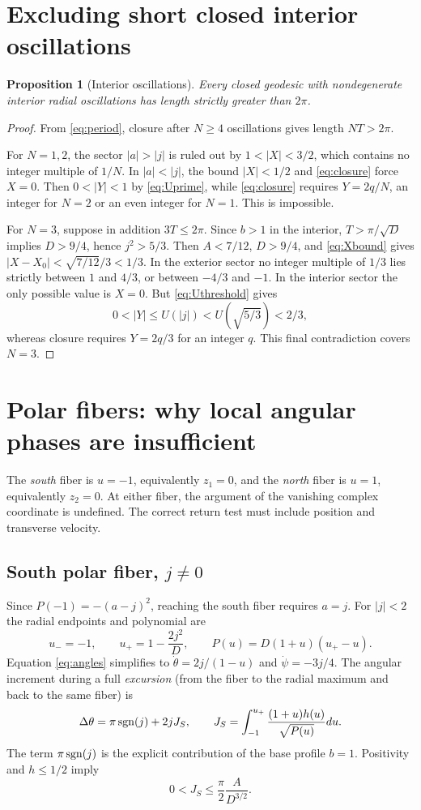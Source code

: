 \documentclass[11pt,a4paper]{article}
\newtheorem{proposition}[theorem]{Proposition}
\theoremstyle{remark}\newtheorem{remark}[theorem]{Remark}
\begin{document}
\section{Excluding short closed interior oscillations}
\begin{proposition}[Interior oscillations]\label{prop:interior}
Every closed geodesic with nondegenerate interior radial oscillations has length strictly greater than $2\pi$.
\end{proposition}
\begin{proof}
From \eqref{eq:period}, closure after $N\ge4$ oscillations gives length $NT>2\pi$.

For $N=1,2$, the sector $|a|>|j|$ is ruled out by $1<|X|<3/2$, which contains no integer multiple of $1/N$. In $|a|<|j|$, the bound $|X|<1/2$ and \eqref{eq:closure} force $X=0$. Then $0<|Y|<1$ by \eqref{eq:Uprime}, while \eqref{eq:closure} requires $Y=2q/N$, an integer for $N=2$ or an even integer for $N=1$. This is impossible.

For $N=3$, suppose in addition $3T\le2\pi$. Since $b>1$ in the interior, $T>\pi/\sqrt D$ implies $D>9/4$, hence $j^2>5/3$. Then $A<7/12$, $D>9/4$, and \eqref{eq:Xbound} gives $|X-X_0|<\sqrt{7/12}/3<1/3$. In the exterior sector no integer multiple of $1/3$ lies strictly between $1$ and $4/3$, or between $-4/3$ and $-1$. In the interior sector the only possible value is $X=0$. But \eqref{eq:Uthreshold} gives
\[
0<|Y|\le U(|j|)<U(\sqrt{5/3})<2/3,
\]
whereas closure requires $Y=2q/3$ for an integer $q$. This final contradiction covers $N=3$.
\end{proof}

\section{Polar fibers: why local angular phases are insufficient}
The \emph{south} fiber is $u=-1$, equivalently $z_1=0$, and the \emph{north} fiber is $u=1$, equivalently $z_2=0$. At either fiber, the argument of the vanishing complex coordinate is undefined. The correct return test must include position and transverse velocity.

\subsection{South polar fiber, $j\ne0$}
Since $P(-1)=-(a-j)^2$, reaching the south fiber requires $a=j$. For $|j|<2$ the radial endpoints and polynomial are
\[
u_-=-1,\qquad u_+=1-\frac{2j^2}{D},\qquad P(u)=D(1+u)(u_+-u).
\]
Equation \eqref{eq:angles} simplifies to $\dot\theta=2j/(1-u)$ and $\dot\psi=-3j/4$. The angular increment during a full \emph{excursion} (from the fiber to the radial maximum and back to the same fiber) is
\begin{equation}\label{eq:south}
\Delta\theta=\pi\operatorname{sgn}(j)+2jJ_S,\qquad
J_S=\int_{-1}^{u_+}\frac{(1+u)h(u)}{\sqrt{P(u)}}du.
\end{equation}
The term $\pi\operatorname{sgn}(j)$ is the explicit contribution of the base profile $b=1$. Positivity and $h\le1/2$ imply
\begin{equation}\label{eq:Js}
0<J_S\le\frac\pi2\frac{A}{D^{3/2}}.
\end{equation}
\end{document}
